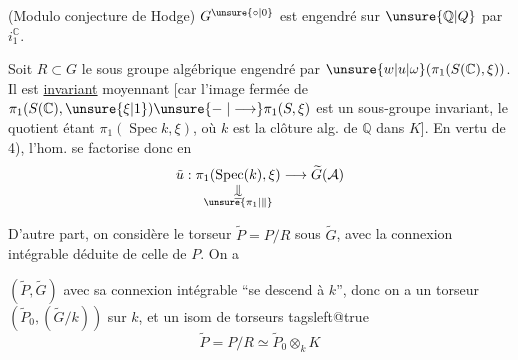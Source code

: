 (Modulo conjecture de Hodge) $G^{\unsure{\circ|0}}$ est engendré sur $\unsure{\mathbb Q|Q}$ par $i_1^{\mathbb C}$.


Soit $R\subset G$ le sous groupe algébrique engendré par $\unsure{w|u|\omega}(\pi_1(S(\mathbb C),\xi))$. Il est \uline{invariant} moyennant  [car l'image fermée de $\pi_1(S(\mathbb C),\unsure{\xi|1})\unsure{\relbar|\longrightarrow}\pi_1(S,\xi)$\unsure{\}|,} est un sous-groupe invariant\unsure{\}|,}, le quotient étant $\pi_1(\operatorname{Spec} k,\xi)$, où $k$ est la clôture alg. de $\mathbb Q$ dans $K$].  En vertu de 4), l'hom.
se factorise donc en
\[
\tilde u:\underset{\substack{\Vert\\[-.4ex]\simeq\\[-.4ex]\unsure{\pi_1|\Vert}}}{\pi_1(\operatorname{Spec}(k),\xi)}
\longrightarrow\widetilde G(\mathcal A)
\]

D'autre part, on considère le torseur $\widetilde P=P/R$ sous $\widetilde G$, avec la connexion intégrable déduite de celle de $P$. On a

  $(\widetilde P,\widetilde G)$ avec sa connexion intégrable ``se descend à $k$'', donc on a un torseur $(\widetilde P_0,(\widetilde G/k))$ sur $k$, et un isom de torseurs
\begingroup
\csname tagsleft@true\endcsname
\[
\widetilde P=P/R\simeq\widetilde P_0\otimes_k K \tag*{(*)}
\]
\endgroup

